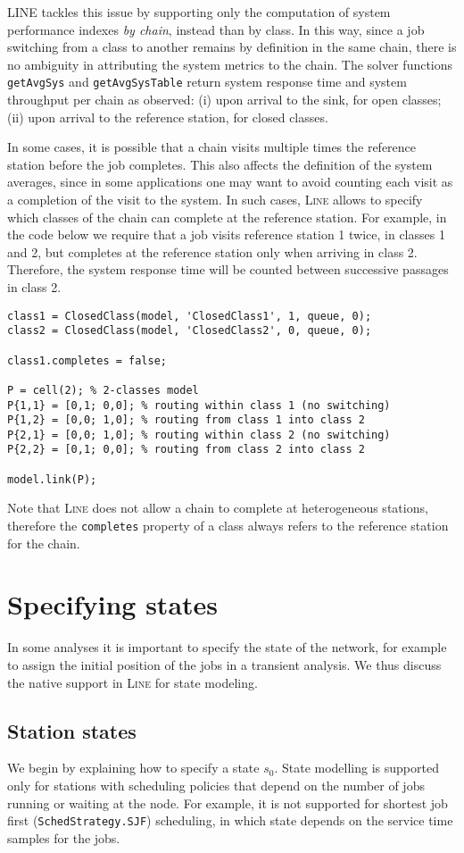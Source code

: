 LINE tackles this issue by supporting only the computation of system performance indexes {\em by chain}, instead than by class. In this way, since a job switching from a class to another remains by definition in the same chain, there is no ambiguity in attributing the system metrics to the chain.  The solver functions \texttt{getAvgSys} and \texttt{getAvgSysTable} return system response time and system throughput per chain as observed: (i) upon arrival to the sink, for open classes; (ii) upon arrival to the reference station, for closed classes.

In some cases, it is possible that a chain visits multiple times the reference station before the job completes. This also affects the definition of the system averages, since in some applications one may want to avoid counting each visit as a completion of the visit to the system. In such cases, \textsc{Line} allows to specify which classes of the chain can complete at the reference station. For example, in the code below we require that a job visits reference station 1 twice, in classes 1 and 2, but completes at the reference station only when arriving in class 2. Therefore, the system response time will be counted between successive passages in class 2.
\begin{lstlisting}
class1 = ClosedClass(model, 'ClosedClass1', 1, queue, 0);
class2 = ClosedClass(model, 'ClosedClass2', 0, queue, 0);

class1.completes = false;

P = cell(2); % 2-classes model
P{1,1} = [0,1; 0,0]; % routing within class 1 (no switching)
P{1,2} = [0,0; 1,0]; % routing from class 1 into class 2
P{2,1} = [0,0; 1,0]; % routing within class 2 (no switching)
P{2,2} = [0,1; 0,0]; % routing from class 2 into class 2

model.link(P);
\end{lstlisting}
Note that \textsc{Line} does not allow a chain to complete at heterogeneous stations, therefore the \texttt{completes} property of a class always refers to the reference station for the chain.


\section{Specifying states}
In some analyses it is important to specify the state of the network, for example to assign the initial position of the jobs in a transient analysis. We thus discuss the native support in \textsc{Line} for state modeling.
\subsection{Station states}
We begin by explaining how to specify a state $s_0$. State modelling is supported only for stations with scheduling policies that depend on the number of jobs running or waiting at the node. For example, it is not supported for shortest job first (\texttt{SchedStrategy.SJF}) scheduling, in which state depends on the service time samples for the jobs.

